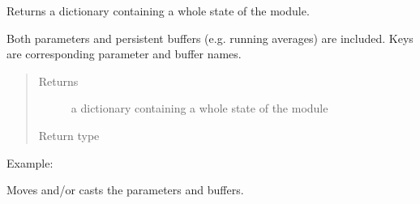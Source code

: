 \documentclass[letterpaper,10pt,english]{sphinxmanual}
\begin{document}
\begin{fulllineitems}
\begin{fulllineitems}
\label{\detokenize{api/autoencoding:geology.metamodelling.SpatialAutoencoder.share_memory}}
\end{fulllineitems}


\begin{fulllineitems}
\label{\detokenize{api/autoencoding:geology.metamodelling.SpatialAutoencoder.state_dict}}
Returns a dictionary containing a whole state of the module.

Both parameters and persistent buffers (e.g. running averages) are
included. Keys are corresponding parameter and buffer names.
\begin{quote}\begin{description}
\item[{Returns}] \leavevmode
a dictionary containing a whole state of the module

\item[{Return type}] \leavevmode
{}

\end{description}\end{quote}

Example:

\begin{sphinxVerbatim}[commandchars=\\\{\}]
\end{sphinxVerbatim}

\end{fulllineitems}


\begin{fulllineitems}
\label{\detokenize{api/autoencoding:geology.metamodelling.SpatialAutoencoder.to}}
Moves and/or casts the parameters and buffers.


\end{fulllineitems}
\end{fulllineitems}
\end{document}
